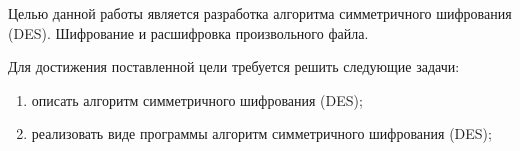 %
%
%


Целью данной работы является разработка алгоритма симметричного шифрования (DES). Шифрование и расшифровка произвольного файла. 

Для достижения поставленной цели требуется решить следующие задачи:
\begin{enumerate}[label={\arabic*)}]
	\item описать алгоритм симметричного шифрования (DES);
	\item реализовать виде программы алгоритм симметричного шифрования (DES);
\end{enumerate}


\clearpage
